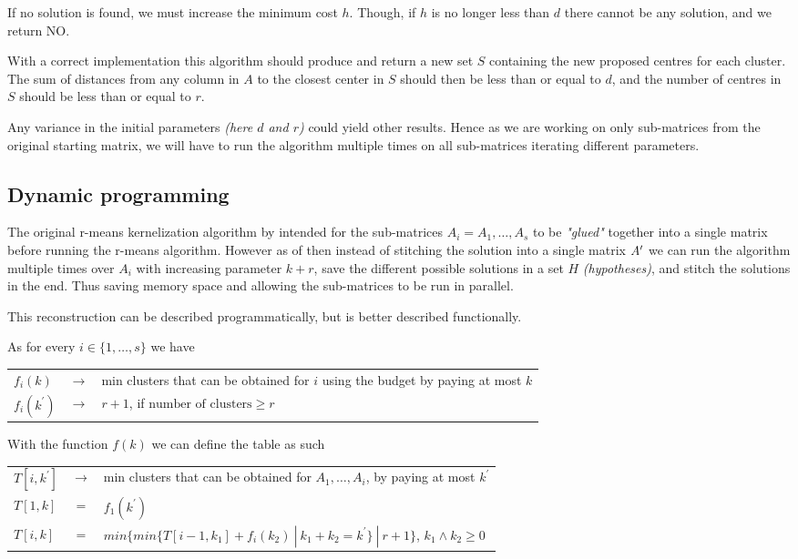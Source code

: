 \documentclass[a4paper]{article}
\begin{document}
If no solution is found, we must increase the minimum cost $h$. Though, if $h$ is no longer less than $d$ there cannot be any solution, and we return NO.



With a correct implementation this algorithm should produce and return a new set $S$ containing the new proposed
centres for each cluster. The sum of distances from any column in $A$ to the closest center in $S$ should then be
less than or equal to $d$, and the number of centres in $S$ should be less than or equal to $r$.

Any variance in the initial parameters \textit{(here $d$ and $r$)} could yield other results. Hence as we are working on
only sub-matrices from the original starting matrix, we will have to run the algorithm multiple times on all sub-matrices
iterating different parameters.

\subsection{Dynamic programming}
\label{sec:dynamic-result}
The original r-means kernelization algorithm by \cite{fomin_golovach_panolan_2020}
intended for the sub-matrices $A_i=A_1,\dots,A_s$ to be \textit{"glued"} together into a single
matrix before running the r-means algorithm. However as of 
then instead of stitching the solution into a single matrix $A\sp{\prime}$
we can run the algorithm multiple times over $A_i$ with increasing parameter $k+r$,
save the different possible solutions in a set $H$ \textit{(hypotheses)}, and stitch the solutions in the end. Thus saving
memory space and allowing the sub-matrices to be run in parallel.

This reconstruction can be described programmatically, but is better described functionally. 

As for every $i \in \{1,\dots,s\}$ we have\\
\begin{tabular}{lcl}
    $f_i(k)$        & $\rightarrow$ & min clusters that can be obtained for $i$ using the budget by paying at most $k$ \\
    $f_i(k^\prime)$ & $\rightarrow$ & $r+1$, if $\text{number of clusters} \geq r$ 
\end{tabular}

With the function $f(k)$ we can define the table as such 
\\
\begin{tabular}{lcl}
    $T[i, k^\prime]$ & $\rightarrow$ & min clusters that can be obtained for $A_1, \dots, A_i$, by paying at most $k^\prime$ \\
    $T[1, k]$ & $=$ & $f_1(k^\prime)$ \\
    $T[i, k]$ & $=$ & $min\{ min\{ T[ i-1, k_1 ] + f_i(k_2) ~|~ k_1 + k_2 = k^\prime \} ~|~ r+1 \}$, $k_1 \wedge k_2 \geq 0$
\end{tabular}
\end{document}
